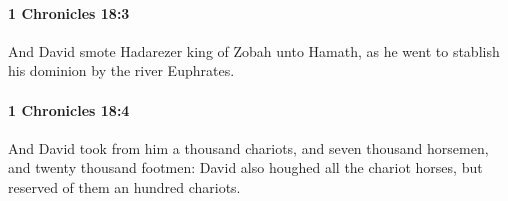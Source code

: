 		\paragraph{1 Chronicles 18:3} %
			\label{1CHRONICLES-18-3}

			And David smote Hadarezer king of Zobah unto Hamath, as he went to stablish his dominion by the river Euphrates.


		\paragraph{1 Chronicles 18:4} %
			\label{1CHRONICLES-18-4}

			And David took from him a thousand chariots, and seven thousand horsemen, and twenty thousand footmen: David also houghed all the chariot horses, but reserved of them an hundred chariots.


